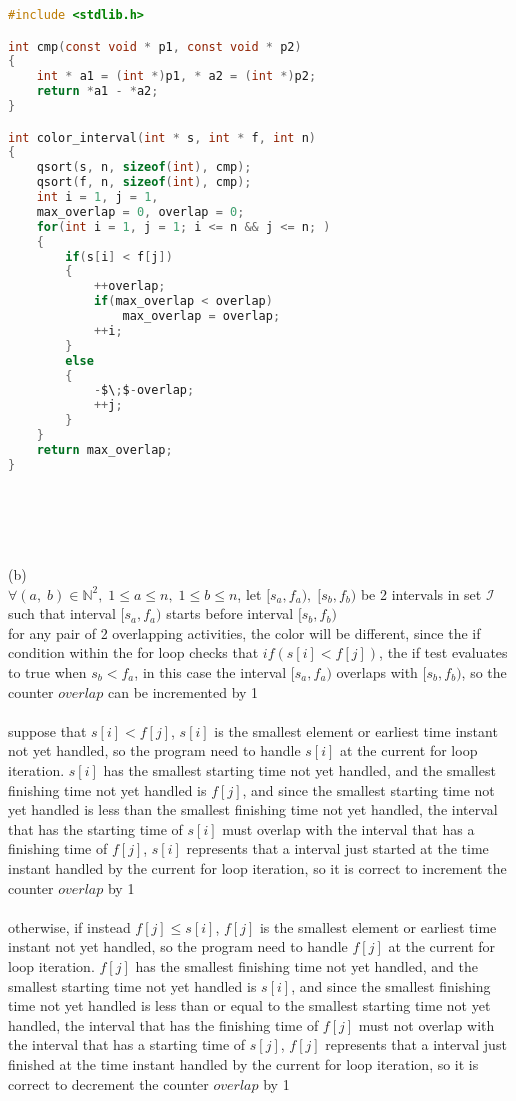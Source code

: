 \documentclass[12pt,border=4pt,multi]{article} %
\begin{document}
\begin{lstlisting}[language = c, mathescape = true]
#include <stdlib.h>

int cmp(const void * p1, const void * p2)
{
    int * a1 = (int *)p1, * a2 = (int *)p2;
    return *a1 - *a2;
}

int color_interval(int * s, int * f, int n)
{
    qsort(s, n, sizeof(int), cmp);
    qsort(f, n, sizeof(int), cmp);
    int i = 1, j = 1, 
    max_overlap = 0, overlap = 0;
    for(int i = 1, j = 1; i <= n && j <= n; )
    {
        if(s[i] < f[j])
        {
            ++overlap;
            if(max_overlap < overlap)
                max_overlap = overlap;
            ++i;
        }
        else
        {
            -$\;$-overlap;
            ++j;
        }
    }
    return max_overlap;
}
\end{lstlisting}
\leavevmode
\\
\\
\\
\\
(b)\\
$\forall (a,\; b) \in \mathbb{N}^2,\; 1 \leq a \leq n,\; 1 \leq b \leq n$, let $[s_a, f_a),\; [s_b, f_b)$ be 2 intervals in set $\mathcal{I}$ such that interval $[s_a, f_a)$ starts before interval $[s_b, f_b)$\\
for any pair of 2 overlapping activities, the color will be different, since the if condition within the for loop checks that $if(s[i] < f[j])$, the if test evaluates to true when $s_b < f_a$, in this case the interval $[s_a, f_a)$ overlaps with $[s_b, f_b)$, so the counter $overlap$ can be incremented by 1\\
\\
suppose that $s[i] < f[j]$, $s[i]$ is the smallest element or earliest time instant not yet handled, so the program need to handle $s[i]$ at the current for loop iteration. $s[i]$ has the smallest starting time not yet handled, and the smallest finishing time not yet handled is $f[j]$, and since the smallest starting time not yet handled is less than the smallest finishing time not yet handled, the interval that has the starting time of $s[i]$ must overlap with the interval that has a finishing time of $f[j]$, $s[i]$ represents that a interval just started at the time instant handled by the current for loop iteration, so it is correct to increment the counter $overlap$ by 1\\
\\
otherwise, if instead $f[j] \leq s[i]$, $f[j]$ is the smallest element or earliest time instant not yet handled, so the program need to handle $f[j]$ at the current for loop iteration. $f[j]$ has the smallest finishing time not yet handled, and the smallest starting time not yet handled is $s[i]$, and since the smallest finishing time not yet handled is less than or equal to the smallest starting time not yet handled, the interval that has the finishing time of $f[j]$ must not overlap with the interval that has a starting time of $s[j]$, $f[j]$ represents that a interval just finished at the time instant handled by the current for loop iteration, so it is correct to decrement the counter $overlap$ by 1\\
\end{document}
